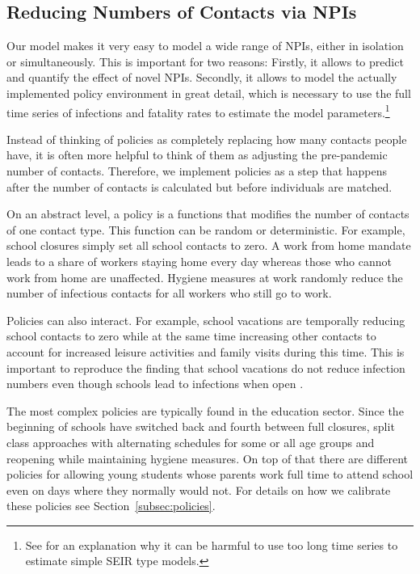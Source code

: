 \subsection{Reducing Numbers of Contacts via NPIs}
\label{sec:policies}



Our model makes it very easy to model a wide range of NPIs, either in isolation or
simultaneously. This is important for two reasons: Firstly, it allows to predict and
quantify the effect of novel NPIs. Secondly, it allows to model the actually implemented
policy environment in great detail, which is necessary to use the full time series
of infections and fatality rates to estimate the model parameters.\footnote{
See \citet{Avery2020} for an explanation why it can be harmful to use too long time
series to estimate simple SEIR type models.}


Instead of thinking of policies as completely replacing how many contacts people have,
it is often more helpful to think of them as adjusting the pre-pandemic number of
contacts. Therefore, we implement policies as a step that happens after the number of contacts is
calculated but before individuals are matched.

On an abstract level, a policy is a functions that modifies the number of contacts of
one contact type. This function can be random or deterministic. For example, school
closures simply set all school contacts to zero. A work from home mandate leads to a
share of workers staying home every day whereas those who cannot work from home are
unaffected. Hygiene measures at work randomly reduce the number of infectious contacts
for all workers who still go to work.

Policies can also interact. For example, school vacations are temporally reducing school
contacts to zero while at the same time increasing other contacts to account for
increased leisure activities and family visits during this time. This is important to
reproduce the finding that school vacations do not reduce infection numbers even though
schools lead to infections when open \citep{Isphording2021}.

The most complex policies are typically found in the education sector. Since the
beginning of  schools have switched back and fourth between
full closures, split class approaches with alternating schedules for some or all age
groups and reopening while maintaining hygiene measures. On top of that there are
different policies for allowing young students whose parents work full time to attend
school even on days where they normally would not. For details on how we calibrate these
policies see Section~\ref{subsec:policies}.

